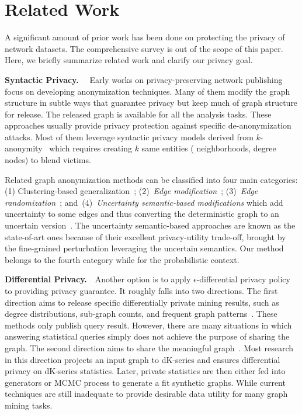 \section{Related Work}
\label{sec:relatedWork}
A significant amount of prior work has been done on protecting the privacy of network datasets.
The comprehensive survey is out of the scope of this paper. 
Here, we briefly summarize related work and clarify our privacy goal. 

\textbf{Syntactic Privacy.}~~
Early works on privacy-preserving network publishing focus on developing anonymization techniques. 
Many of them modify the graph structure in subtle ways that guarantee privacy but keep much of graph structure for release. 
The released graph is available for all the analysis tasks. 
These approaches usually provide privacy protection against specific de-anonymization attacks. 
Most of them leverage syntactic privacy models derived from $k$-anonymity~\cite{Sweeney:2002:KAM:774544.774552} which requires creating $k$ same entities ({\eg} neighborhoods, degree nodes) to blend victims. 

Related graph anonymization methods can be classified into four main categories: (1) Clustering-based generalization~\cite{Hay_Anonymizing_2007,Bhagat_Class_2009,hay2010resisting}; (2)~{\em Edge modification}~\cite{Liu_Towards_2008, Zhou_Preserving_2008, Wang2011, Wu_k_2010, Skarkala_Privacy_2012}; 
(3)~{\em Edge randomization}~\cite{Liu_Privacy_2009,Ying_Randomizing_2008, Ninggal_Utility_2015};
and~(4)~{\em Uncertainty semantic-based modifications} which add uncertainty to some edges and thus converting the deterministic graph to an uncertain version~\cite{Boldi_Injecting_2012, Nguyen_Anonymizing_2015}. The uncertainty semantic-based approaches are known as the state-of-art ones because of their excellent privacy-utility trade-off, brought by the fine-grained perturbation leveraging the uncertain semantics. 
Our method belongs to the fourth category while for the probabilistic context. 

 
\textbf{Differential Privacy.}~~Another option is to apply {$\epsilon$}-differential privacy policy to providing privacy guarantee. It roughly falls into two directions. The first direction aims to release specific differentially private mining results, such as degree distributions, sub-graph counts, and frequent graph patterns~\cite{Xiao_Differentially_2014,Day:2016}. These methods only publish query result. However, there are many situations in which answering statistical queries simply does not achieve the purpose of sharing the graph.  
The second direction aims to share the meaningful graph~\cite{Sala_Sharing_2011}. Most research in this direction projects an input graph to dK-series and ensures differential privacy on dK-series statistics. Later, private statistics are then either fed into generators or MCMC process to generate a fit synthetic graphs. While current techniques are still inadequate to provide desirable data utility for many graph mining tasks. 

